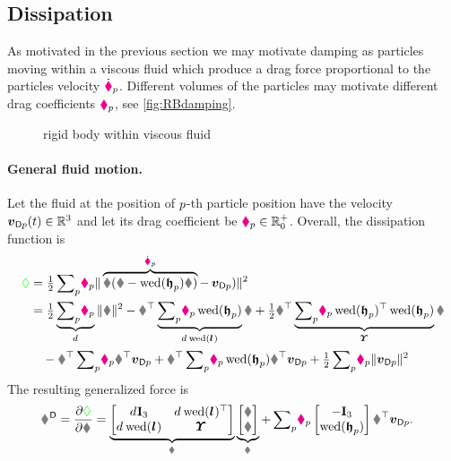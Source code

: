\subsection{Dissipation}\label{sec:DampingSE3}
As motivated in the previous section we may motivate damping as particles moving within a viscous fluid which produce a drag force proportional to the particles velocity $\dot{\boldsymbol{\textcolor{magenta}{\blacklozenge}}}_{p}$.
Different volumes of the particles may motivate different drag coefficients $\textcolor{magenta}{\blacklozenge}_{p}$, see \autoref{fig:RBdamping}.
\begin{figure}[ht]
 \centering
 
 \caption{rigid body within viscous fluid}
 \label{fig:RBdamping}
\end{figure}

\paragraph{General fluid motion.}
Let the fluid at the position of $p$-th particle position have the velocity $\boldsymbol{v}_{\mathsf{D}p}(t)\in\mathbb{R}^3$ and let its drag coefficient be $\textcolor{magenta}{\blacklozenge}_{p}\in\mathbb{R}^{+}_{0}$.
Overall, the dissipation function is
\begin{align}
 \dissFkt &= \tfrac{1}{2} \sumParticles \!\particleDamping{\PidxI} \norm{\overbrace{\R(\v - \wedOp(\particleBodyPos{\PidxI})\w)}^{\particlePosd{\PidxI}} - \, \tuple{v}_{\mathsf{D}\PidxI})}^2
\nonumber\\
 &= \tfrac{1}{2} \underbrace{\sumParticles \!\particleDamping{\PidxI}}_{\bodyDamping{}{}} \norm{\v}^2
  - \v^\top \underbrace{\sumParticles \!\particleDamping{\PidxI} \wedOp(\particleBodyPos{\PidxI})}_{\bodyDamping{}{} \wedOp(\bodyCOD{}{})} \w
  + \tfrac{1}{2} \w^\top \underbrace{\sumParticles \!\particleDamping{\PidxI} \wedOp(\particleBodyPos{\PidxI})^\top \wedOp(\particleBodyPos{\PidxI})}_{\bodyMOD{}{}} \w
\nonumber\\
 &\quad - \v^\top \sumParticles \!\particleDamping{\PidxI} \R^\top \tuple{v}_{\mathsf{D}\PidxI}
  + \w^\top \sumParticles \!\particleDamping{\PidxI} \wedOp(\particleBodyPos{\PidxI}) \R^\top \tuple{v}_{\mathsf{D}\PidxI}
 + \tfrac{1}{2} \sumParticles \!\particleDamping{\PidxI} \norm{\tuple{v}_{\mathsf{D}\PidxI}}^2
\end{align}
The resulting generalized force is
\begin{align}
 \bodyGenForceDiss{}{} &= \pdiff[\dissFkt]{\bodyVel{}{}} =
 \underbrace{\begin{bmatrix} \bodyDamping{}{}\idMat[3] & \bodyDamping{}{} \wedOp(\bodyCOD{}{})^\top \\ \bodyDamping{}{} \wedOp(\bodyCOD{}{}) & \bodyMOD{}{} \end{bmatrix}}_{\bodyDissMat{}{}}
 \underbrace{\begin{bmatrix} \v \\ \w \end{bmatrix}}_{\bodyVel{}{}}
 +
 \sumParticles \!\particleDamping{\PidxI} \begin{bmatrix} -\idMat[3] \\ \wedOp(\particleBodyPos{\PidxI}) \end{bmatrix} \R^\top \tuple{v}_{\mathsf{D}\PidxI}.
\end{align}
